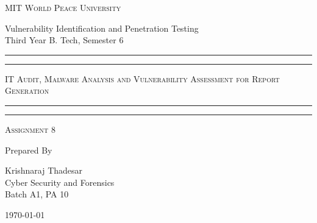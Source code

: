 \documentclass[11pt]{article}
\begin{document}
\begin{titlepage}
    \centering


    \huge\textsc{
        MIT World Peace University
    }\\

    \vspace{0.75\baselineskip} %

    \LARGE{
        Vulnerability Identification and Penetration Testing\\
        Third Year B. Tech, Semester 6
    }

    \vfill %


    \rule{\textwidth}{1.6pt}\vspace*{-\baselineskip}\vspace*{2pt}
    \rule{\textwidth}{0.6pt}
    \vspace{0.75\baselineskip} %



    \huge{\textsc{
            IT Audit, Malware Analysis and Vulnerability Assessment for Report Generation
        }} \\



    \vspace{0.5\baselineskip} %
    \rule{\textwidth}{0.6pt}\vspace*{-\baselineskip}\vspace*{2.8pt}
    \rule{\textwidth}{1.6pt}

    \vspace{1\baselineskip} %


    \LARGE\textsc{
        Assignment 8
    } %
    \vfill


    Prepared By
    \vspace{0.5\baselineskip} %

    \Large{
        Krishnaraj Thadesar \\
        Cyber Security and Forensics\\
        Batch A1, PA 10
    }


    \vspace{0.5\baselineskip} %
    \today

\end{titlepage}
\end{document}
